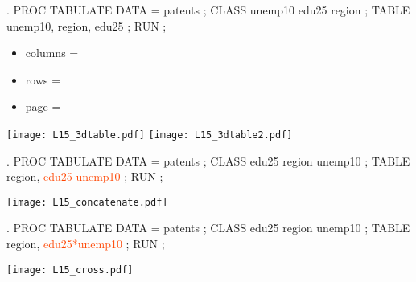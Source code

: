 \begin{frame}[fragile]
\begin{code}{.}
PROC TABULATE DATA = patents ;
   CLASS unemp10 edu25 region ;
   TABLE unemp10, region, edu25 ;
RUN ;
\end{code}
\emp
\blankcolumn
{}
\begin{itemize}
\item columns = 
\item rows = 
\item page = 
\end{itemize}
\emp
\vspace{10pt}
\texttt{[image: L15\_3dtable.pdf]}
\emp
\blankcolumn
{}
\texttt{[image: L15\_3dtable2.pdf]}
\emp
\end{frame}




\begin{frame}[fragile]
\hspace*{-0.3in}
\begin{code}{.}
PROC TABULATE DATA = patents ;
   CLASS edu25 region unemp10 ;
   TABLE region, \textcolor{OrangeRed}{edu25 unemp10} ;
RUN ;
\end{code}
\texttt{[image: L15\_concatenate.pdf]}
\emp
\blankcolumn
{}
\begin{code}{.}
PROC TABULATE DATA = patents ;
   CLASS edu25 region unemp10 ;
   TABLE region, \textcolor{OrangeRed}{edu25*unemp10} ;
RUN ;
\end{code}
\texttt{[image: L15\_cross.pdf]}
\emp
\end{frame}



